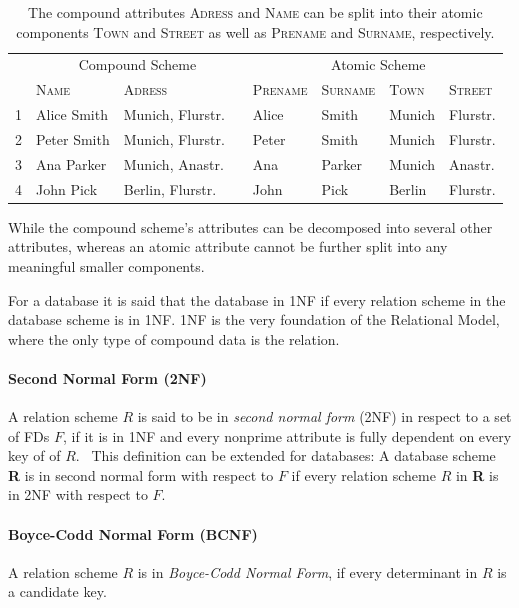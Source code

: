 \begin{table}[ht]
    \centering
    \begin{tabular}{rlllllll}\toprule
    & \multicolumn{3}{c}{Compound Scheme} & & \multicolumn{2}{c}{Atomic Scheme} \\
    \cmidrule{2-3} \cmidrule{5-8}
    & \textsc{Name} & \textsc{Adress} && \textsc{Prename} & \textsc{Surname} & \textsc{Town} & \textsc{Street}   \\ \midrule
1 & Alice Smith & Munich, Flurstr. && Alice & Smith & Munich & Flurstr. \\
2 & Peter Smith & Munich, Flurstr. && Peter & Smith & Munich & Flurstr. \\
3 & Ana Parker & Munich, Anastr. && Ana & Parker & Munich & Anastr. \\
4 & John Pick & Berlin, Flurstr. && John & Pick & Berlin & Flurstr. \\
\bottomrule
\end{tabular}
\caption{The compound attributes \textsc{Adress} and \textsc{Name} can be split into their atomic components \textsc{Town} and \textsc{Street} as well as \textsc{Prename} and \textsc{Surname}, respectively.}\label{tab:first-normal-form}
\end{table}
While the compound scheme's attributes can be decomposed into several other attributes, whereas an atomic attribute cannot be further split into any meaningful smaller components.

For a database it is said that the database in 1NF if every relation scheme in the database scheme is in 1NF.
1NF is the very foundation of the Relational Model, where the only type of compound data is the relation.~\cite[p.~6]{COD90}

\paragraph{Second Normal Form (2NF)} A relation scheme \(R\) is said to be in \emph{second normal form} (2NF) in respect to a set of FDs \(F\), if it is in 1NF and every nonprime attribute is fully dependent on every key of of \(R\).~\cite[p.~99]{MAI83}
This definition can be extended for databases: A database scheme \textbf{R} is in second normal form with respect to \(F\) if every relation scheme \(R\) in \textbf{R} is in 2NF with respect to \(F\).

\paragraph{Boyce-Codd Normal Form (BCNF)}
A relation scheme \( R \) is in \emph{Boyce-Codd Normal Form}, if every determinant in \( R \) is a candidate key.~\cite[p.~65]{SCH17}


